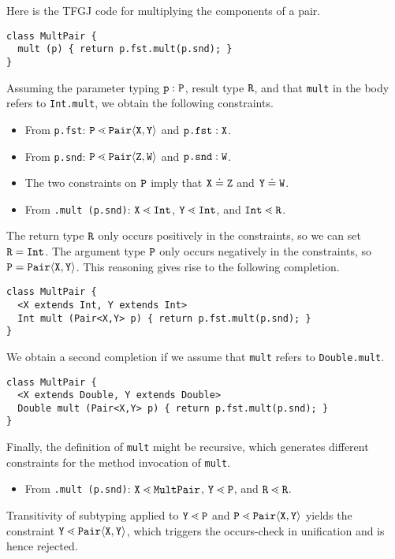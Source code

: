 Here is the TFGJ code  for multiplying the components of a pair.
\begin{lstlisting}
class MultPair {
  mult (p) { return p.fst.mult(p.snd); }
}
\end{lstlisting}
Assuming the parameter typing ${\tt p}:{\tt P}$, result type ${\tt R}$, and that
\texttt{mult} in the body refers to \texttt{Int.mult}, we
obtain the following constraints.
\begin{itemize}
\item From \texttt{p.fst}: ${\tt P} \lessdot \mathtt{Pair}\langle{\tt X},{\tt Y}\rangle$ and
  $\texttt{p.fst} : {\tt X}$.
\item From \texttt{p.snd}: ${\tt P} \lessdot \mathtt{Pair}\langle{\tt Z},{\tt W}\rangle$ and
  $\texttt{p.snd} : {\tt W}$.
\item The two constraints on ${\tt P}$ imply that ${\tt X} \doteq {\tt Z}$ and
  ${\tt Y} \doteq {\tt W}$.
\item From \texttt{.mult (p.snd)}: ${\tt X} \lessdot \mathtt{Int}$, ${\tt Y} \lessdot
  \mathtt{Int}$, and $\mathtt{Int} \lessdot {\tt R}$.
\end{itemize}
The return type ${\tt R}$ only occurs positively in the constraints, so we can
set ${\tt R} = \mathtt{Int}$.
The argument type ${\tt P}$ only occurs negatively in the constraints,
so ${\tt P} = \mathtt{Pair} \langle{\tt X},{\tt Y}\rangle$.
This reasoning gives rise to the following completion.
\begin{lstlisting}
class MultPair {
  <X extends Int, Y extends Int>
  Int mult (Pair<X,Y> p) { return p.fst.mult(p.snd); }
}
\end{lstlisting}
We obtain a second completion if we assume that \texttt{mult} refers to
\texttt{Double.mult}.
\begin{lstlisting}
class MultPair {
  <X extends Double, Y extends Double>
  Double mult (Pair<X,Y> p) { return p.fst.mult(p.snd); }
}
\end{lstlisting}

Finally, the definition of \texttt{mult} might be recursive, which
generates different constraints for the method invocation of \texttt{mult}.
\begin{itemize}
\item From \texttt{.mult (p.snd)}: ${\tt X} \lessdot \mathtt{MultPair}$, ${\tt Y} \lessdot
  \mathtt{P}$, and $\mathtt{R} \lessdot {\tt R}$.
\end{itemize}
Transitivity of subtyping applied to ${\tt Y} \lessdot \mathtt{P}$ and ${\tt P} \lessdot \mathtt{Pair}\langle{\tt X},{\tt Y}\rangle$
yields the constraint ${\tt Y} \lessdot \mathtt{Pair}\langle{\tt X},{\tt Y}\rangle$, which triggers the
occurs-check in unification and is hence rejected. 

